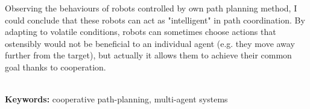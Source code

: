 \begin{singlespacing}
Observing the behaviours of robots controlled by own path planning method, I could conclude that these robots can act as "intelligent" in path coordination.
By adapting to volatile conditions, robots can sometimes choose actions that ostensibly would not be beneficial to an individual agent (e.g. they move away further from the target), but actually it allows them to achieve their common goal thanks to cooperation.

\flushbottom
\textbf{\\Keywords: }cooperative path-planning, multi-agent systems
\end{singlespacing}
